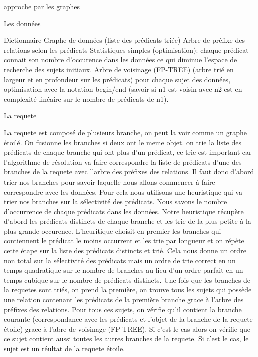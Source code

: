 approche par les graphes

Les données

Dictionnaire
Graphe de données (liste des prédicats triée)
Arbre de préfixe des relations selon les prédicats
Statistiques simples (optimisation): chaque prédicat connait son nombre d'occurence dans les données ce qui diminue l'espace de recherche des sujets initiaux.
Arbre de voisinage (FP-TREE) (arbre trié en largeur et en profondeur sur les prédicats) pour chaque sujet des données, optimisation avec la notation begin/end (savoir si n1 est voisin avec n2 est en complexité linéaire sur le nombre de prédicats de n1).

La requete

La requete est composé de plusieurs branche, on peut la voir comme un graphe étoilé.
On fusionne les branches si deux ont le meme objet.
on trie la liste des prédicats de chaque branche qui ont plus d'un prédicat, ce trie est important car l'algorithme de résolution va faire correspondre la liste de prédicats d'une des branches de la requete avec l'arbre des préfixes des relations.
Il faut donc d'abord trier nos branches pour savoir laquelle nous allons commencer à faire correspondre avec les données. Pour cela nous utilisons une heuristique qui va trier nos branches sur la sélectivité des prédicats. Nous savons le nombre d'occurrence de chaque prédicats dans les données. Notre heuristique récupère d'abord les prédicats distincts de chaque branche et les trie de la plus petite à la plus grande occurence. L'heuritique choisit en premier les branches qui contiennent le prédicat le moins occurrent et les trie par longueur et on répète cette étape sur la liste des prédicats distincts et trié. Cela nous donne un ordre non total sur la sélectivité des prédicats mais un ordre de trie correct en un temps quadratique sur le nombre de branches au lieu d'un ordre parfait en un temps cubique sur le nombre de prédicats distincts.
Une fois que les branches de la requetes sont triés, on prend la première, on trouve tous les sujets qui possède une relation contenant les prédicats de la première branche grace à l'arbre des préfixes des relations. Pour tous ces sujets, on vérifie qu'il contient la branche courante (correspondance avec les prédicats et l'objet de la branche de la requete étoile) grace à l'abre de voisinage (FP-TREE). Si c'est le cas alors on vérifie que ce sujet contient aussi toutes les autres branches de la requete. Si c'est le cas, le sujet est un réultat de la requete étoile.

